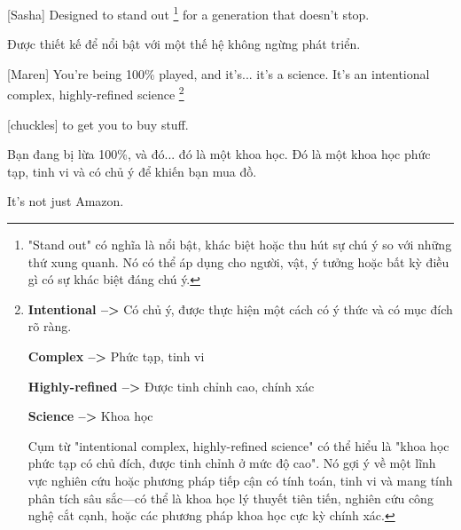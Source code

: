 \documentclass[a4paper]{article}
\begin{document}
	[Sasha] Designed to stand out  \footnote{
		"Stand out" có nghĩa là nổi bật, khác biệt hoặc thu hút sự chú ý so với những thứ xung quanh. Nó có thể áp dụng cho người, vật, ý tưởng hoặc bất kỳ điều gì có sự khác biệt đáng chú ý.
	} for a generation that doesn't stop.
	
	\begin{vietnamese-v2}
		[Sasha] Được thiết kế để nổi bật với một thế hệ không ngừng phát triển.
	\end{vietnamese-v2}

	\pagebreak
	
	[Maren] You're being 100\% played, and it's... it's a science. It's an intentional complex, highly-refined science  \footnote{
		\textbf{Intentional -->} Có chủ ý, được thực hiện một cách có ý thức và có mục đích rõ ràng.
		
		\textbf{Complex -->} Phức tạp, tinh vi
		
		\textbf{Highly-refined -->} Được tinh chỉnh cao, chính xác
		
		\textbf{Science -->} Khoa học
		
		Cụm từ "intentional complex, highly-refined science" có thể hiểu là "khoa học phức tạp có chủ đích, được tinh chỉnh ở mức độ cao". Nó gợi ý về một lĩnh vực nghiên cứu hoặc phương pháp tiếp cận có tính toán, tinh vi và mang tính phân tích sâu sắc—có thể là khoa học lý thuyết tiên tiến, nghiên cứu công nghệ cắt cạnh, hoặc các phương pháp khoa học cực kỳ chính xác.
	
	} 
	
	[chuckles] to get you to buy stuff.
	
	\begin{vietnamese-v2}
		[Maren] Bạn đang bị lừa 100\%, và đó... đó là một khoa học. Đó là một khoa học phức tạp, tinh vi và có chủ ý để khiến bạn mua đồ.
	\end{vietnamese-v2}
	
	It's not just Amazon.
	
\end{document}
